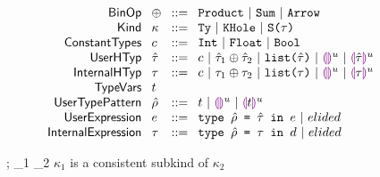 \documentclass[12pt,letterpaper]{article}
\newcommand{\kconsubkind}[3]{#1 \vdash #2 \lesssim #3}
\newcommand{\kindAssign}[3]{#1 \vdash #2 : #3}
\newcommand{\kequiv}[3]{#1 \vdash #2 \equiv #3}
\newcommand{\hPhi}{\Phi}
\newcommand{\hexp}{e}
\newcommand{\dexp}{d}
\newcommand{\htau}{\hat{\tau}}
\newcommand{\hkappa}{\kappa}
\newcommand{\dtau}{\tau}
\newcommand{\hrho}{\hat{\rho}}
\newcommand{\Ty}{\textt{Ty}}
\newcommand{\KHole}{\textt{KHole}}
\newcommand{\KSing}[1]{\textt{S(}#1{\textt{)}}}
\newcommand{\hlist}[1]{\textt{list(}#1\textt{)}}
\newcommand{\llparenthesiscolor}{\textcolor{violet}{\llparenthesis}}
\newcommand{\rrparenthesiscolor}{\textcolor{violet}{\rrparenthesis}}
\newcommand{\hthole}[1]{\llparenthesiscolor\rrparenthesiscolor^{#1}}
\newcommand{\hhole}[2]{\llparenthesiscolor#1\rrparenthesiscolor^{#2}}
\newcommand{\htdefine}[3]{\textt{type }#1 \textt{ = } #2\textt{ in }#3}
\newcommand{\dtdefine}[3]{\textt{type }#1 \textt{ = } #2\textt{ in }#3}
\begin{document}
\begin{figure}[t]
	$\arraycolsep=4pt\begin{array}{rllllll}
			\mathsf{BinOp}               & \oplus & ::= &
			\textt{Product} ~\vert~ \textt{Sum} ~\vert~ \textt{Arrow}                                          \\
			\mathsf{Kind}                & \kappa & ::= &
			\Ty ~\vert~ \KHole ~\vert~ \KSing{\tau}                                                            \\
			\mathsf{Constant Types}      & c      & ::= &
			\textt{Int} ~\vert~ \textt{Float} ~\vert~ \textt{Bool}                                             \\
			\mathsf{User HTyp}           & \htau  & ::= &
			c ~\vert~ \htau_1 \oplus \htau_2 ~\vert~ \hlist{\htau} ~\vert~ \hthole{u} ~\vert~ \hhole{\htau}{u} \\
			\mathsf{Internal HTyp}       & \dtau  & ::= &
			c ~\vert~ \dtau_1 \oplus \dtau_2 ~\vert~ \hlist{\dtau} ~\vert~ \hthole{u} ~\vert~ \hhole{\dtau}{u} \\
			\mathsf{Type Vars}           & t      &     &                                                      \\
			\mathsf{User Type Pattern}   & \hrho  & ::= &
			t ~\vert~ \hthole{u} ~\vert~ \hhole{t}{u}                                                          \\
			\mathsf{User Expression}     & \hexp  & ::= &
			\htdefine{\hrho}{\htau}{\hexp} ~\vert~ elided                                                      \\
			\mathsf{Internal Expression} & \dtau  & ::= &
			\dtdefine{\hrho}{\dtau}{\dexp} ~\vert~ elided                                                      \\
		\end{array}$
\end{figure}


\begin{minipage}{\linewidth}
	\judgbox
	{\kconsubkind{\Delta;\hPhi}{\hkappa_1}{\hkappa_2}}
	{$\hkappa_1$ is a consistent subkind of $\hkappa_2$}
\end{minipage}
\\
\\
\end{document}
